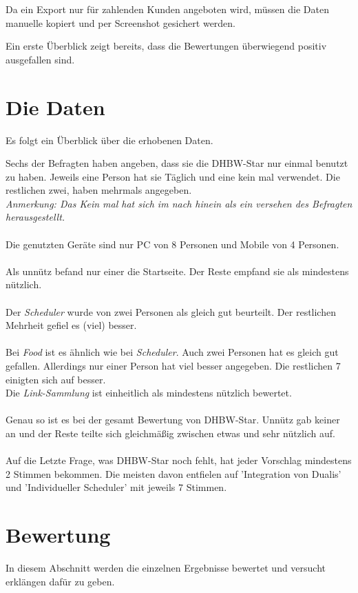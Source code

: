 Da ein Export nur für zahlenden Kunden angeboten wird, müssen die Daten manuelle kopiert und per Screenshot gesichert werden.

Ein erste Überblick zeigt bereits, dass die Bewertungen überwiegend positiv ausgefallen sind.

\section{Die Daten}
Es folgt ein Überblick über die erhobenen Daten.

Sechs der Befragten haben angeben, dass sie die DHBW-Star nur einmal benutzt zu haben.
Jeweils eine Person hat sie Täglich und eine kein mal verwendet.
Die restlichen zwei, haben mehrmals angegeben.\\
\emph{Anmerkung: Das Kein mal hat sich im nach hinein als ein versehen des Befragten herausgestellt.}\\
\\
Die genutzten Geräte sind nur PC von 8 Personen und Mobile von 4 Personen.\\
\\
Als unnütz befand nur einer die Startseite. Der Reste empfand sie als mindestens nützlich.\\
\\
Der \emph{Scheduler} wurde von zwei Personen als gleich gut beurteilt. Der restlichen Mehrheit gefiel es (viel) besser.\\
\\
Bei \emph{Food} ist es ähnlich wie bei \emph{Scheduler}. Auch zwei Personen hat es gleich gut gefallen. Allerdings nur einer Person hat viel besser angegeben. Die restlichen 7 einigten sich auf besser.
\\
Die \emph{Link-Sammlung} ist einheitlich als mindestens nützlich bewertet.\\
\\
Genau so ist es bei der gesamt Bewertung von DHBW-Star. Unnütz gab keiner an und der Reste teilte sich gleichmäßig zwischen etwas und sehr nützlich auf.\\
\\
Auf die Letzte Frage, was DHBW-Star noch fehlt, hat jeder Vorschlag mindestens 2 Stimmen bekommen. Die meisten davon entfielen auf 'Integration von Dualis' und 'Individueller Scheduler' mit jeweils 7 Stimmen.

\section{Bewertung}
In diesem Abschnitt werden die einzelnen Ergebnisse bewertet und versucht erklängen dafür zu geben.

